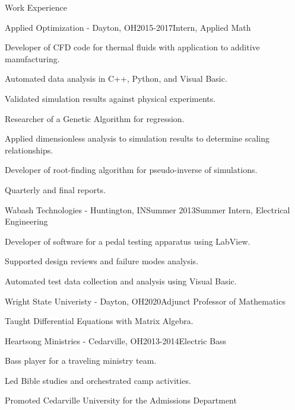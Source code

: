 \documentclass{resume} %
\begin{document}
\begin{rSection}{Work Experience}
\begin{rSubsection}{Applied Optimization - Dayton, OH}{2015-2017}{Intern, Applied Math}{}
\item Developer of CFD code for thermal fluids with application to additive manufacturing.
\item Automated data analysis in C++, Python, and Visual Basic.
\item Validated simulation results against physical experiments.
\item Researcher of a Genetic Algorithm for regression.
\item Applied dimensionless analysis to simulation results to determine scaling relationships.
\item Developer of root-finding algorithm for pseudo-inverse of simulations.
\item Quarterly and final reports.
\end{rSubsection}

\begin{rSubsection}{Wabash Technologies - Huntington, IN}{Summer 2013}{Summer Intern, Electrical Engineering}{}
\item Developer of software for a pedal testing apparatus using LabView.
\item Supported design reviews and failure modes analysis.
\item Automated test data collection and analysis using Visual Basic.
\end{rSubsection}

\begin{rSubsection}{Wright State Univeristy - Dayton, OH}{2020}{Adjunct Professor of Mathematics}{}
\item Taught Differential Equations with Matrix Algebra.
\end{rSubsection}

\begin{rSubsection}{Heartsong Ministries - Cedarville, OH}{2013-2014}{Electric Bass}{}
\item Bass player for a traveling ministry team.
\item Led Bible studies and orchestrated camp activities.
\item Promoted Cedarville University for the Admissions Department
\end{rSubsection}

\end{rSection}
\end{document}
